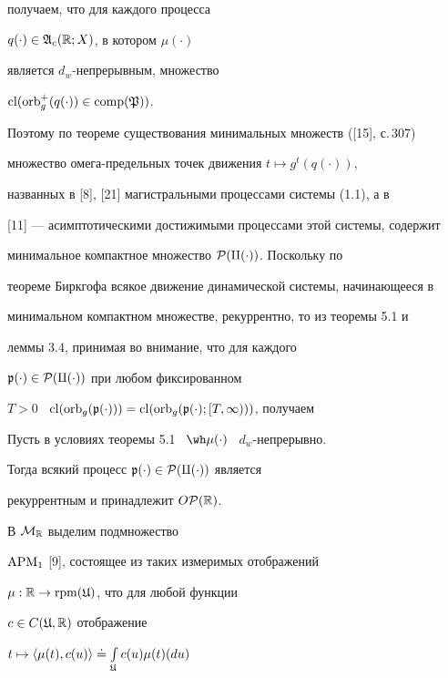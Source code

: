 получаем, что для каждого процесса


$q(\cdot)\in\frak A_c(\Bbb R;X)$, в котором $\mu(\cdot)$


является $d_{w}$-непрерывным, множество


$\operatorname{cl}(\operatorname{orb}_g^+(q(\cdot))\in\operatorname{comp}(\frak P))$.


Поэтому по теореме существования минимальных множеств ([15], с.\,307)


множество омега-предельных точек движения $t\mapsto g^t(q(\cdot))$,


названных в [8], [21] магистральными процессами системы (1.1), а в


[11] --- асимптотическими достижимыми процессами этой системы, содержит


минимальное компактное множество $\cal P(q(\cdot))$. Поскольку по


теореме Биркгофа всякое движение динамической системы, начинающееся в


минимальном компактном множестве, рекуррентно, то из теоремы 5.1 и


леммы 3.4, принимая во внимание, что для каждого


$\frak p(\cdot)\in\cal P(q(\cdot))$ при любом фиксированном


$T>0$ \ $\cl(\orb_g({\frak p}(\cdot)))=


\cl(\orb_g(\frak p(\cdot);[T,\infty)))$, получаем








\begin{cors}


Пусть в условиях теоремы 5.1 \ $\wh\mu(\cdot)$ \ $d_{w}$-непрерывно.


Тогда всякий процесс $\frak p(\cdot)\in\cal P(q(\cdot))$ является 


рекуррентным и принадлежит $O\cal P(\Bbb R)$.


\end{cors}





В $\cal M_{\Bbb R}$ выделим подмножество


$\operatorname{APM}_1$ [9], состоящее из таких измеримых отображений


$\mu:\Bbb R\to\operatorname{rpm}(\frak U)$, что для любой функции


$c\in C(\frak U,\Bbb R)$ отображение


$t\mapsto\langle\mu(t),c(u)\rangle\doteq\int\limits_{\frak U}c(u)\mu(t)(du)$



